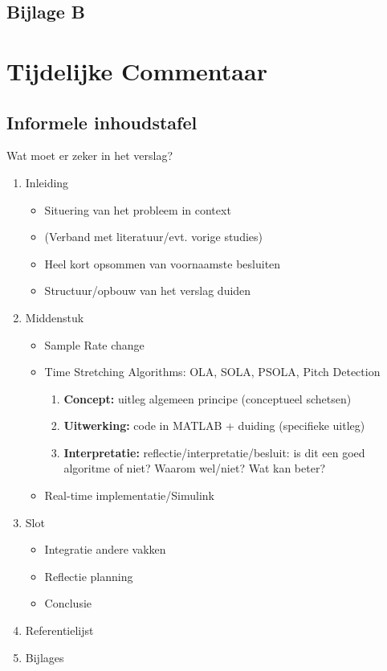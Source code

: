 \documentclass[12pt]{report}
\begin{document}
\section{Bijlage B}




\chapter{Tijdelijke Commentaar}

\section{Informele inhoudstafel}
Wat moet er zeker in het verslag?
\begin{enumerate}
\item Inleiding
\begin{itemize}
\item Situering van het probleem in context
\item (Verband met literatuur/evt. vorige studies)
\item Heel kort opsommen van voornaamste besluiten
\item Structuur/opbouw van het verslag duiden
\end{itemize}
\item Middenstuk
\begin{itemize}
\item Sample Rate change
\item Time Stretching Algorithms: OLA, SOLA, PSOLA, Pitch Detection
\begin{enumerate}
\item \textbf{Concept:} uitleg algemeen principe (conceptueel schetsen)
\item \textbf{Uitwerking:} code in MATLAB + duiding (specifieke uitleg)
\item \textbf{Interpretatie:} reflectie/interpretatie/besluit: is dit een goed algoritme of niet? Waarom wel/niet? Wat kan beter?
\end{enumerate}
\item Real-time implementatie/Simulink
\end{itemize}
\item Slot
\begin{itemize}
\item Integratie andere vakken
\item Reflectie planning
\item Conclusie
\end{itemize}
\item Referentielijst
\item Bijlages
\end{enumerate}
\end{document}
